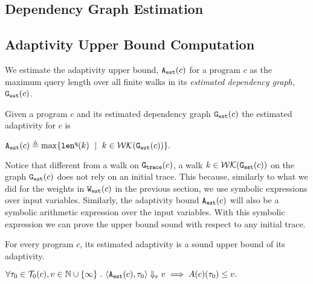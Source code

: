 \subsection{Dependency Graph Estimation}
\highlight{}
\subsection{Adaptivity Upper Bound Computation}
\label{sec:alg_adaptcompute}
We estimate the adaptivity upper bound, ${\mathtt{A_{est}}}(c)$ for a program $c$ as the maximum query length over all finite walks in its \emph{estimated dependency graph}, $\mathtt{{G_{est}}}({c})$.
%

\begin{defn}
\label{def:prog_adapt}
{
Given a program ${c}$ and its estimated dependency graph 
$\mathtt{{G_{est}}}({c})$
the estimated adaptivity for $c$ is 
\begin{center}
$
\progA({c})
\triangleq \max
\left\{ \qlen(k) \ \mid \  k \in \walks(\progG(c))\right \}.
$
\end{center}
}
\end{defn}



Notice that different from a walk on $\mathtt{{G_{trace}}}(c)$, a walk $k \in \mathcal{WK}(\mathtt{{G_{est}}}(c))$ on the graph $\mathtt{{G_{est}}}(c)$  does not rely on an initial trace. This because, similarly to what we did for the weights in $\mathtt{{W_{est}}}(c)$ in the previous section, we use symbolic expressions over input variables. Similarly, the adaptivity bound ${\mathtt{A_{est}}}(c)$ will also be a symbolic arithmetic expression over the input variables. With this symbolic expression we can prove the upper bound sound with respect to any initial trace. 

%
\begin{thm}
    \label{thm:sound_progadapt}
    For every program $c$, 
    its estimated adaptivity is a sound upper bound of its adaptivity.
\begin{center}
$
     \forall \mathtt{\tau}_0 \in \mathcal{T}_{0}(c), v \in \mathbb{N}\cup \{\infty\} ~.~ 
\langle {\ensuremath{\mathtt{A_{est}}}}(c), \mathtt{\tau}_0 \rangle \Downarrow_e v \implies A(c)(\mathtt{\tau}_0) \leq v.
$
\end{center}
\end{thm}

